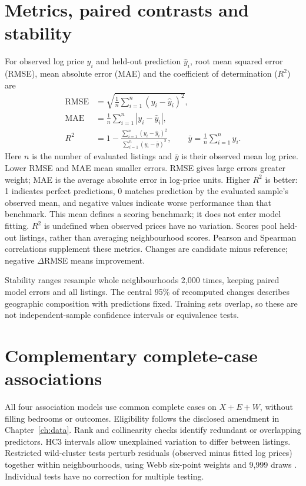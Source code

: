 \documentclass[11pt,a4paper,oneside,openany]{memoir}
\begin{document}
\section{Metrics, paired contrasts and stability}
\label{sec:metrics-method}
For observed log price $y_i$ and held-out prediction $\hat y_i$, root mean
squared error (RMSE), mean absolute error (MAE) and the coefficient of
determination ($R^2$) are
\begin{align*}
 \mathrm{RMSE}&=\sqrt{\frac{1}{n}\sum_{i=1}^{n}(y_i-\hat y_i)^2},\\
 \mathrm{MAE}&=\frac{1}{n}\sum_{i=1}^{n}|y_i-\hat y_i|,\\
 R^2&=1-\frac{\sum_{i=1}^{n}(y_i-\hat y_i)^2}
                  {\sum_{i=1}^{n}(y_i-\bar y)^2},
 \qquad \bar y=\frac{1}{n}\sum_{i=1}^{n}y_i.
\end{align*}
Here $n$ is the number of evaluated listings and $\bar y$ is their observed
mean log price. Lower RMSE and MAE mean smaller errors. RMSE gives large errors
greater weight; MAE is the average absolute error in log-price units.
Higher $R^2$ is better: 1 indicates perfect predictions, 0 matches prediction
by the evaluated sample's observed mean, and negative values indicate worse
performance than that benchmark. This mean defines a scoring benchmark; it
does not enter model fitting. $R^2$ is undefined when observed prices have no
variation. Scores pool held-out listings, rather than averaging neighbourhood
scores. Pearson and Spearman correlations supplement these metrics.
Changes are candidate minus reference; negative $\Delta$RMSE means improvement.

Stability ranges resample whole neighbourhoods 2,000 times, keeping paired
model errors and all listings. The central 95\% of recomputed changes describes
geographic composition with predictions fixed. Training sets overlap, so these
are not independent-sample confidence intervals or equivalence tests.

\section{Complementary complete-case associations}
\label{sec:association-method}
All four association models use common complete cases on $X+E+W$, without filling bedrooms
or outcomes. Eligibility follows the disclosed amendment in Chapter~\ref{ch:data}.
Rank and collinearity checks identify redundant or overlapping predictors.
HC3 intervals allow unexplained variation to differ between
listings. Restricted wild-cluster tests perturb residuals (observed minus
fitted log prices) together within neighbourhoods, using Webb six-point weights and
9,999 draws \parencite{methods_mnw2023}. Individual tests have no correction
for multiple testing.
\end{document}
